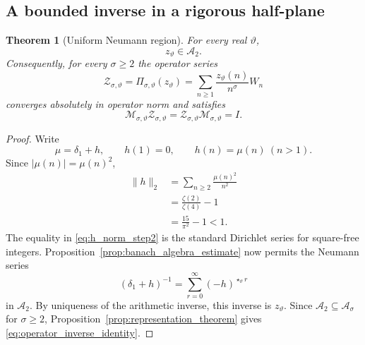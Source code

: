 \documentclass[11pt]{amsart}
\numberwithin{equation}{section}
\theoremstyle{plain}
\newtheorem{theorem}{Theorem}[section]
\theoremstyle{definition}
\theoremstyle{remark}
\newcommand{\twconv}{\star_{\vartheta}}
\newcommand{\deltaone}{\delta_{1}}
\begin{document}
\subsection{A bounded inverse in a rigorous half-plane}
\label{subsec:bounded_inverse}

\begin{theorem}[Uniform Neumann region]
\label{thm:neumann_region}
For every real $\vartheta$,
\begin{equation}
z_{\vartheta}\in\mathcal A_2.
\label{eq:ztheta_in_A2}
\end{equation}
Consequently, for every $\sigma\ge2$ the operator series
\begin{equation}
\mathcal Z_{\sigma,\vartheta}
=
\Pi_{\sigma,\vartheta}(z_{\vartheta})
=
\sum_{n\ge1}
\frac{z_{\vartheta}(n)}{n^{\sigma}}W_n
\label{eq:zeta_operator_deformed}
\end{equation}
converges absolutely in operator norm and satisfies
\begin{equation}
\mathcal M_{\sigma,\vartheta}
\mathcal Z_{\sigma,\vartheta}
=
\mathcal Z_{\sigma,\vartheta}
\mathcal M_{\sigma,\vartheta}
=I.
\label{eq:operator_inverse_identity}
\end{equation}
\end{theorem}

\begin{proof}
Write
\begin{equation}
\mu=\deltaone+h,
\qquad
h(1)=0,
\qquad
h(n)=\mu(n)\ (n>1).
\label{eq:mu_delta_h}
\end{equation}
Since $|\mu(n)|=\mu(n)^2$,
\begin{align}
\|h\|_2
&=
\sum_{n\ge2}\frac{\mu(n)^2}{n^2}
\label{eq:h_norm_step1}\\
&=
\frac{\zeta(2)}{\zeta(4)}-1
\label{eq:h_norm_step2}\\
&=
\frac{15}{\pi^2}-1
<1.
\label{eq:h_norm_step3}
\end{align}
The equality in \eqref{eq:h_norm_step2} is the standard Dirichlet series for
square-free integers.  Proposition~\ref{prop:banach_algebra_estimate} now
permits the Neumann series
\begin{equation}
(\deltaone+h)^{-1}
=
\sum_{r=0}^{\infty}(-h)^{\twconv r}
\label{eq:neumann_inverse}
\end{equation}
in $\mathcal A_2$.  By uniqueness of the arithmetic inverse, this inverse is
$z_{\vartheta}$.  Since $\mathcal A_2\subseteq\mathcal A_{\sigma}$ for
$\sigma\ge2$, Proposition~\ref{prop:representation_theorem} gives
\eqref{eq:operator_inverse_identity}.
\end{proof}
\end{document}
